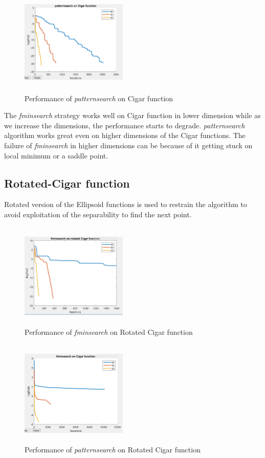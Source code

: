 \begin{figure}[H]
\includegraphics[height=2in, width=2in]{images/patternsearch_cigar}
\caption{Performance of \textit{patternsearch} on Cigar function}
\end{figure}

The \textit{fminsearch} strategy works well on Cigar function in lower dimension while as we increase the dimensions, the performance starts to degrade. \textit{patternsearch} algorithm works great even on higher dimensions of the Cigar functions. The failure of \textit{fminsearch} in higher dimensions can be because of it getting stuck on local minimum or a saddle point.

\subsection{Rotated-Cigar function}
Rotated version of the Ellipsoid functions is used to restrain the algorithm to avoid exploitation of the separability to find the next point. 

\begin{figure}[H]
\includegraphics[height=2in, width=2in]{images/fminsearch_rotcigar}
\caption{Performance of \textit{fminsearch} on Rotated Cigar function}
\end{figure}

\begin{figure}[H]
\includegraphics[height=2in, width=2in]{images/patternsearch_rotcigar}
\caption{Performance of \textit{patternsearch} on Rotated Cigar function}
\end{figure}

